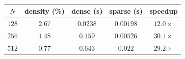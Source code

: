 \begin{tabular}{ccccc}
  \toprule
  $N$ & density (\%) & dense (s) & sparse (s) & speedup \\
  \midrule
  $128$ & $2.67$ & $0.0238$ & $0.00198$ & $12.0\times$ \\
  $256$ & $1.48$ & $0.159$ & $0.00526$ & $30.1\times$ \\
  $512$ & $0.77$ & $0.643$ & $0.022$ & $29.2\times$ \\
  \bottomrule
\end{tabular}
